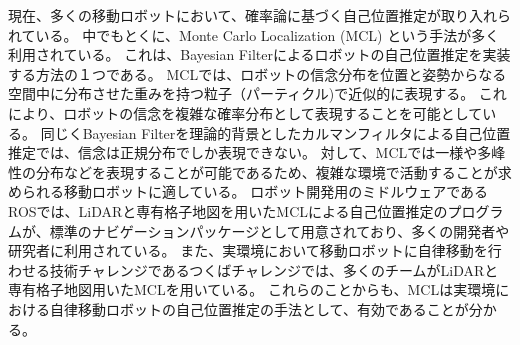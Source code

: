 現在、多くの移動ロボットにおいて、確率論に基づく自己位置推定が取り入れられている。
中でもとくに、Monte Carlo Localization (MCL) という手法が多く利用されている\cite{dellaert1999}\cite{fox1999}。
これは、Bayesian Filterによるロボットの自己位置推定を実装する方法の１つである。
MCLでは、ロボットの信念分布を位置と姿勢からなる空間中に分布させた重みを持つ粒子（パーティクル)で近似的に表現する。
これにより、ロボットの信念を複雑な確率分布として表現することを可能としている。
同じくBayesian Filterを理論的背景としたカルマンフィルタによる自己位置推定では、信念は正規分布でしか表現できない\cite{kalman1960}。
対して、MCLでは一様や多峰性の分布などを表現することが可能であるため、複雑な環境で活動することが求められる移動ロボットに適している。
ロボット開発用のミドルウェアであるROSでは、LiDARと専有格子地図を用いたMCLによる自己位置推定のプログラムが、標準のナビゲーションパッケージとして用意されており、多くの開発者や研究者に利用されている\cite{quigley2009ros,roswiki_amcl}。
また、実環境において移動ロボットに自律移動を行わせる技術チャレンジであるつくばチャレンジでは、多くのチームがLiDARと専有格子地図用いたMCLを用いている。
\cite{夏迫2016つくばチャレンジ}
これらのことからも、MCLは実環境における自律移動ロボットの自己位置推定の手法として、有効であることが分かる。


